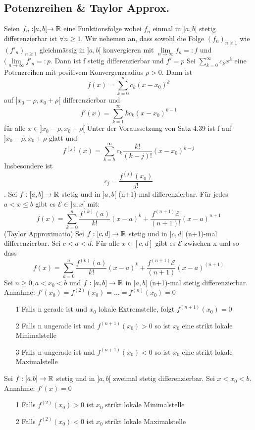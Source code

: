 \subsection{Potenzreihen \& Taylor Approx.}
 Seien  \(f_n: ]a,b[ \rightarrow \mathbb{R} \) eine Funktionsfolge wobei \(f_n\) einmal in \(]a,b[\) stetig differenzierbar ist \( \forall n \geq 1\). Wir nehemen an, dass sowohl die Folge \((f_n)_{n \geq 1}\) wie \((f'_n)_{n \geq 1}\) gleichmässig in \(]a,b[\) konvergieren mit \(\lim\limits_{n \rightarrow \infty} f_n =: f \) und \((\lim\limits_{n \rightarrow \infty} f'_n =: p \). Dann ist f stetig differenzierbar und \(f' = p\)
 Sei \(\sum_{k=0}^\infty c_kx^k\) eine Potenzreihen mit positivem Konvergenzradius \(\rho > 0\). Dann ist
\[f(x) = \sum_{k=0}^\infty c_k(x - x_0)^k\]
auf \(] x_0 - \rho, x_0 + \rho [\) differenzierbar und
\[f'(x) = \sum_{k=1}^\infty kc_k(x - x_0)^{k-1}\]
für alle \( x \in ]x_0 - \rho , x_0 + \rho [\)
 Unter der Voraussetzung von Satz 4.39 ist f auf \(] x_0 - \rho, x_0 + \rho \) glatt und
\[f^(j)(x) = \sum_{k=h}^\infty c_k \frac{k!}{(k-j)!}(x - x_0)^{k-j}\]
Insbesondere ist
\[c_j = \frac{f^{(j)}(x_0)}{j!}\].
 Sei \(f: [a,b] \rightarrow \mathbb{R}\) stetig und in \(]a,b[\) (n+1)-mal differenzierbar. Für jedes \(a < x \leq b \) gibt es \(\mathcal{E} \in ]a,x[ \) mit:
\[ f(x) = \sum_{k=0}^n \frac{f^{(k)}(a)}{k!}(x -a)^k + \frac{f^{(n+1)}\mathcal{E}}{(n+1)!}(x - a)^{n+1} \]
 (Taylor Approximatio)
Sei \(f : [c,d] \rightarrow \mathbb{R} \) stetig und in \(]c,d[ \) (n+1)-mal differenzierbar. Sei \( c < a < d\). Für alle \(x \in [c,d]\) gibt es \( \mathcal{E}\) zwischen x und so dass
\[f(x) = \sum_{k=0}^n \frac{f^{(k)}(a)}{k!} (x-a)^k + \frac{f^{(n+1)}\mathcal{E}}{(n+1)} (x-a)^{(n+1)}\]
 Sei \( n \geq 0,  a < x_0 < b \) und \(f: [a,b] \rightarrow \mathbb{R}\) in \(]a,b[\) (n+1)-mal stetig differenzierbar. Annahme: \(f'(x_0) = f^{(2)}(x_0) = \dots = f^{(n)}(x_0) = 0\)
\begin{enumerate}
    \item [1] Falls n gerade ist und \(x_0\) lokale Extremstelle, folgt \(f^{(n+1)}(x_0) = 0\)
    \item [2] Falls n ungerade ist und \(f^{(n+1)}(x_0) > 0\) so ist \(x_0\) eine strikt lokale Minimalstelle
    \item [3] Falls n ungerade ist und \(f^{(n+1)}(x_0) < 0\) so ist \(x_0\) eine strikt lokale Maximalstelle
\end{enumerate}
 Sei \(f : [a.b] \rightarrow \mathbb{R} \) stetig und in \(]a,b[\) zweimal stetig differenzierbar. Sei \(x < x_0 < b\). Annahme: \(f'(x) = 0\)
\begin{enumerate}
    \item [1] Falls \(f^{(2)}(x_0) > 0\) ist \(x_0\) strikt lokale Minimalstelle
    \item [2] Falls \(f^{(2)}(x_0) < 0\) ist \(x_0\) strikt lokale Maximalstelle
\end{enumerate}